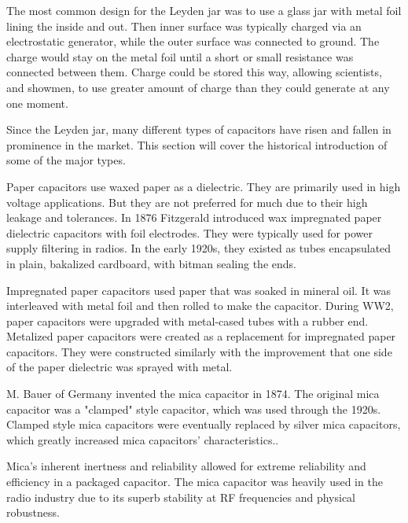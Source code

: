 \noindent The most common design for the Leyden jar was to use a glass jar with metal foil lining the inside and out. Then inner surface was typically charged via an electrostatic generator, while the outer surface was connected to ground. The charge would stay on the metal foil until a short or small resistance was connected between them. Charge could be stored this way, allowing scientists, and showmen, to use greater amount of charge than they could generate at any one moment.

\noindent Since the Leyden jar, many different types of capacitors have risen and fallen in prominence in the market. This section will cover the historical introduction of some of the major types.

\noindent Paper capacitors use waxed paper as a dielectric. They are primarily used in high voltage applications. But they are not preferred for much due to their high leakage and tolerances.\cite{learn_caps} In 1876 Fitzgerald introduced wax impregnated paper dielectric capacitors with foil electrodes.\cite[ch.~11]{dumInv} \cite{learn_caps} They were typically used for power supply filtering in radios. In the early 1920s, they existed as tubes encapsulated in plain, bakalized cardboard, with bitman sealing the ends.\cite[ch~3]{dumInv}

\noindent Impregnated paper capacitors used paper that was soaked in mineral oil. It was interleaved with metal foil and then rolled to make the capacitor.\cite[ch.~8.2.1.1]{poorIntro} \noindent During WW2, paper capacitors were upgraded with metal-cased tubes with a rubber end.\cite[ch.~8.1]{poorIntro} Metalized paper capacitors were created as a replacement for impregnated paper capacitors. They were constructed similarly with the improvement that one side of the paper dielectric was sprayed with metal.\cite{hist_cerFilt}


\nocite{hh_cap_table}
\nocite{capGuide_mica}
\noindent M. Bauer of Germany invented the mica capacitor in 1874. The original mica capacitor was a "clamped" style capacitor, which was used through the 1920s.\cite{wiki_mica} Clamped style mica capacitors were eventually replaced by silver mica capacitors, which greatly increased mica capacitors' characteristics.\cite{learn_caps}.

\noindent Mica's inherent inertness and reliability allowed for extreme reliability and efficiency in a packaged capacitor.\cite{tedds_mica} The mica capacitor was heavily used in the radio industry due to its superb stability at RF frequencies and physical robustness.\cite{radio_mica}

